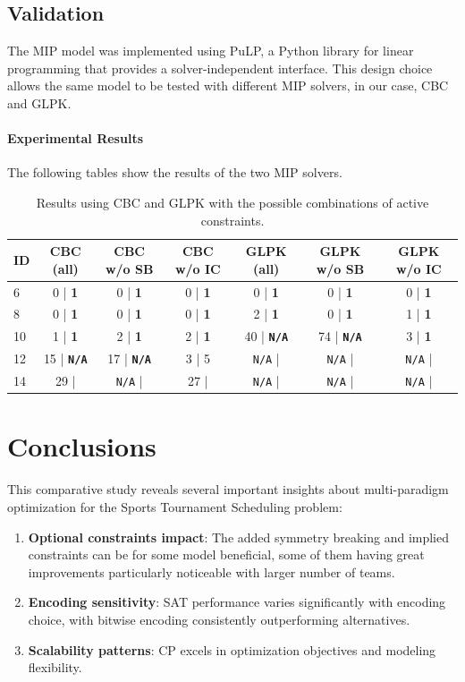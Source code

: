 \documentclass[11pt]{article}
\begin{document}
\subsection{Validation}

The MIP model was implemented using PuLP, a Python library for linear programming that provides a solver-independent interface. This design choice allows the same model to be tested with different MIP solvers, in our case, CBC and GLPK.

\paragraph{Experimental Results} The following tables show the results of the two MIP solvers.

\begin{table}[H]
\centering
\small
\label{tab:mip}
\begin{tabular}{@{}lcccccc@{}}
\toprule
ID & CBC (all) & CBC w/o SB & CBC w/o IC & GLPK (all) & GLPK w/o SB & GLPK w/o IC \\
\midrule
6 & 0 | \textbf{1} & 0 | \textbf{1} & 0 | \textbf{1} & 0 | \textbf{1} & 0 | \textbf{1} & 0 | \textbf{1}\\
8 & 0 | \textbf{1} & 0 | \textbf{1} & 0 | \textbf{1} & 2 | \textbf{1} & 0 | \textbf{1} & 1 | \textbf{1}\\
10 & 1 | \textbf{1} & 2 | \textbf{1} & 2 | \textbf{1} & 40 | \textbf{\texttt{N/A}} & 74 | \textbf{\texttt{N/A}} & 3 | \textbf{1}\\
12 & 15 | \textbf{\texttt{N/A}} & 17 | \textbf{\texttt{N/A}} & 3 | 5 & \texttt{N/A} |& \texttt{N/A} |& \texttt{N/A} |\\
14 & 29 | & \texttt{N/A} | & 27 | & \texttt{N/A} |& \texttt{N/A} |& \texttt{N/A} |\\
\bottomrule
\end{tabular}
\caption{Results using CBC and GLPK with the possible combinations of active constraints.}
\end{table}

\section{Conclusions}

This comparative study reveals several important insights about multi-paradigm optimization for the Sports Tournament Scheduling problem:

\begin{enumerate}    
    \item \textbf{Optional constraints impact}: The added symmetry breaking and implied constraints can be for some model beneficial, some of them having great improvements particularly noticeable with larger number of teams.
    
    \item \textbf{Encoding sensitivity}: SAT performance varies significantly with encoding choice, with bitwise encoding consistently outperforming alternatives.
    
    \item \textbf{Scalability patterns}: CP excels in optimization objectives and modeling flexibility.
\end{enumerate}
\end{document}
